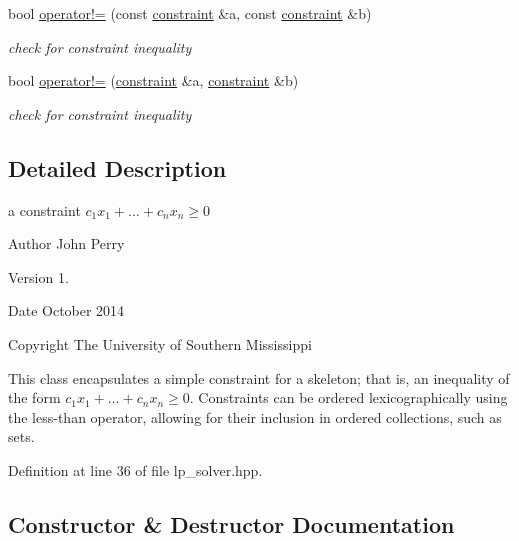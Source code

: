 \begin{DoxyCompactItemize}
bool \hyperlink{classconstraint_a6b57d19474acdea10ab0a0e954ef3ef9}{operator!=} (const \hyperlink{classconstraint}{constraint} \&a, const \hyperlink{classconstraint}{constraint} \&b)
\begin{DoxyCompactList}\small\item\em check for constraint inequality \end{DoxyCompactList}\item 
bool \hyperlink{classconstraint_a75ee7037f652ba94155890c109b88ef8}{operator!=} (\hyperlink{classconstraint}{constraint} \&a, \hyperlink{classconstraint}{constraint} \&b)
\begin{DoxyCompactList}\small\item\em check for constraint inequality \end{DoxyCompactList}\end{DoxyCompactItemize}


\subsection{Detailed Description}
a constraint $ c_1 x_1 + \ldots + c_n x_n \geq 0 $ 

\begin{DoxyAuthor}{Author}
John Perry 
\end{DoxyAuthor}
\begin{DoxyVersion}{Version}
1. 
\end{DoxyVersion}
\begin{DoxyDate}{Date}
October 2014 
\end{DoxyDate}
\begin{DoxyCopyright}{Copyright}
The University of Southern Mississippi
\end{DoxyCopyright}
This class encapsulates a simple constraint for a skeleton; that is, an inequality of the form $ c_1 x_1 + \ldots + c_n x_n \geq 0 $. Constraints can be ordered lexicographically using the less-\/than operator, allowing for their inclusion in ordered collections, such as sets. 

Definition at line 36 of file lp\+\_\+solver.\+hpp.



\subsection{Constructor \& Destructor Documentation}
\mbox{\label{classconstraint_aac499533508fc7e6fcdfad614dbecc48}} 
